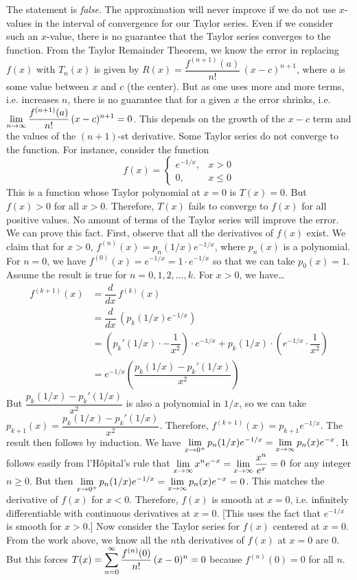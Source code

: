 \documentclass[11pt,letterpaper]{article}
\begin{document}
\sol The statement is \textit{false}. The approximation will never improve if we do not use $x$-values in the interval of convergence for our Taylor series. Even if we consider such an $x$-value, there is no guarantee that the Taylor series converges to the function. From the Taylor Remainder Theorem, we know the error in replacing $f(x)$ with $T_n(x)$ is given by $R(x)= \dfrac{f^{(n+1)}(a)}{n!}\, (x - c)^{n+1}$, where $a$ is some value between $x$ and $c$ (the center). But as one uses more and more terms, i.e. increases $n$, there is no guarantee that for a given $x$ the error shrinks, i.e. $\displaystyle\lim_{n \to \infty} \dfrac{f^{(n+1)}(a)}{n!}\, (x - c)^{n+1}= 0$. This depends on the growth of the $x - c$ term and the values of the $(n+1)$-st derivative. Some Taylor series do not converge to the function. For instance, consider the function 
	\[
	f(x)=
	\begin{cases}
	e^{-1/x}, & x > 0 \\
	0, & x \leq 0
	\end{cases}
	\]
This is a function whose Taylor polynomial at $x= 0$ is $T(x)= 0$. But $f(x) > 0$ for all $x > 0$. Therefore, $T(x)$ fails to converge to $f(x)$ for all positive values. No amount of terms of the Taylor series will improve the error. We can prove this fact. First, observe that all the derivatives of $f(x)$ exist. We claim that for $x > 0$, $f^{(n)}(x)= p_n(1/x) e^{-1/x}$, where $p_n(x)$ is a polynomial. For $n= 0$, we have $f^{(0)}(x)= e^{-1/x}= 1 \cdot e^{-1/x}$ so that we can take $p_0(x)= 1$. Assume the result is true for $n= 0, 1, 2, \ldots, k$. For $x > 0$, we have\dots
	\[
	\begin{aligned}
	f^{(k+1)}(x)&= \dfrac{d}{dx} \, f^{(k)}(x) \\
	&=\dfrac{d}{dx} \, \left( p_k(1/x) e^{-1/x} \right) \\
	&= \left( p_k'(1/x) \cdot -\dfrac{1}{x^2} \right) \cdot e^{-1/x} + p_k(1/x) \cdot \left( e^{-1/x} \cdot \dfrac{1}{x^2} \right) \\
	&= e^{-1/x} \left( \dfrac{p_k(1/x) - p_k'(1/x)}{x^2} \right)
	\end{aligned}
	\]
But $\dfrac{p_k(1/x) - p_k'(1/x)}{x^2}$ is also a polynomial in $1/x$, so we can take $p_{k+1}(x)= \dfrac{p_k(1/x) - p_k'(1/x)}{x^2}$. Therefore, $f^{(k+1)}(x)= p_{k+1} e^{-1/x}$. The result then follows by induction. We have $\displaystyle\lim_{x \to 0^+} p_n(1/x) e^{-1/x}= \lim_{x \to \infty} p_n(x) e^{-x}$. It follows easily from l'H\^opital's rule that $\displaystyle\lim_{x \to \infty} x^n e^{-x}= \displaystyle\lim_{x \to \infty} \dfrac{x^n}{e^x}= 0$ for any integer $n \geq 0$. But then $\displaystyle\lim_{x \to 0^+} p_n(1/x) e^{-1/x}= \lim_{x \to \infty} p_n(x) e^{-x}= 0$. This matches the derivative of $f(x)$ for $x < 0$. Therefore, $f(x)$ is smooth at $x= 0$, i.e. infinitely differentiable with continuous derivatives at $x= 0$. [This uses the fact that $e^{-1/x}$ is smooth for $x > 0$.] Now consider the Taylor series for $f(x)$ centered at $x= 0$. From the work above, we know all the $n$th derivatives of $f(x)$ at $x= 0$ are 0. But this forces $\displaystyle T(x)= \sum_{n=0}^\infty \dfrac{f^{(n)}(0)}{n!} \,(x - 0)^n= 0$ because $f^{(n)}(0)= 0$ for all $n$. \pvspace{1.3cm}
\end{document}
